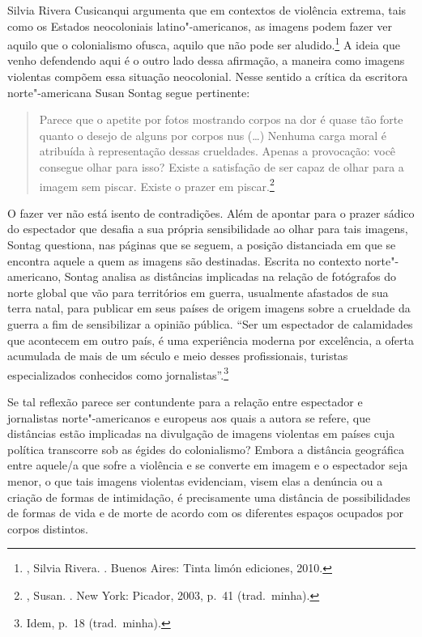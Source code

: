 \asterisc

Silvia Rivera Cusicanqui argumenta que em contextos de violência extrema,
tais como os Estados neocoloniais latino"-americanos, as imagens podem fazer
ver aquilo que o colonialismo ofusca, aquilo que não pode ser
aludido.\footnote{, Silvia Rivera. {}. Buenos Aires: Tinta limón
  ediciones, 2010.} A ideia que venho defendendo aqui é o outro lado
dessa afirmação, a maneira como imagens violentas compõem essa situação
neocolonial. Nesse sentido a crítica da escritora norte"-americana Susan
Sontag segue pertinente:

\begin{quote}
Parece que o apetite por fotos mostrando corpos na dor é quase tão forte quanto o desejo de alguns por corpos nus (\ldots{}) Nenhuma carga moral é atribuída à
representação dessas crueldades. Apenas a provocação: você consegue olhar para isso? Existe a satisfação de ser capaz de olhar para a imagem sem piscar. Existe o prazer em piscar.\footnote{, Susan. {}. New York: Picador, 2003, p.~41 (trad.~minha).}
\end{quote}

O fazer ver não está isento de contradições. Além de apontar para o
prazer sádico do espectador que desafia a sua própria sensibilidade ao
olhar para tais imagens, Sontag questiona, nas páginas que se seguem, a
posição distanciada em que se encontra aquele a quem as imagens são
destinadas. Escrita no contexto norte"-americano, Sontag analisa as
distâncias implicadas na relação de fotógrafos do norte global que vão
para territórios em guerra, usualmente afastados de sua terra natal,
para publicar em seus países de origem imagens sobre a crueldade da
guerra a fim de sensibilizar a opinião pública. ``Ser um espectador de calamidades que acontecem em outro país, é uma experiência moderna por excelência, a oferta acumulada de mais de um século e meio desses profissionais, turistas especializados conhecidos como jornalistas''.\footnote{Idem, p.~18 (trad.~minha).}

Se tal reflexão parece ser contundente para a relação entre espectador e
jornalistas norte"-americanos e europeus aos quais a autora se refere,
que distâncias estão implicadas na divulgação de imagens violentas em
países cuja política transcorre sob as égides do colonialismo? Embora a
distância geográfica entre aquele/a que sofre a violência e se converte
em imagem e o espectador seja menor, o que tais imagens violentas
evidenciam, visem elas a denúncia ou a criação de formas de intimidação,
é precisamente uma distância de possibilidades de formas de vida e de
morte de acordo com os diferentes espaços ocupados por corpos distintos.

